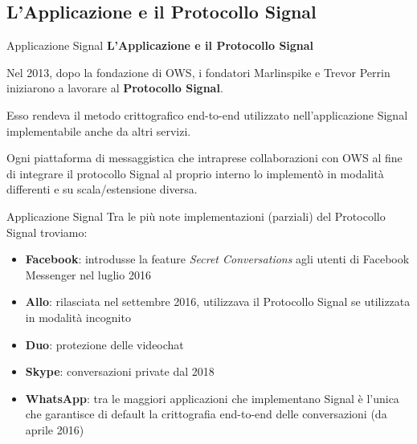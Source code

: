 \subsection{L'Applicazione e il Protocollo Signal}
\begin{frame}{Applicazione Signal}
    \textbf{L'Applicazione e il Protocollo Signal}
    \newline
    
    Nel 2013, dopo la fondazione di OWS, i fondatori Marlinspike e Trevor Perrin iniziarono a lavorare al \textbf{Protocollo Signal}.\newline\pause
    
    Esso rendeva il metodo crittografico end-to-end utilizzato nell’applicazione Signal implementabile anche da altri servizi. \newline\pause
    
    Ogni piattaforma di messaggistica che intraprese collaborazioni con OWS al fine di integrare il protocollo Signal al proprio interno lo implementò in modalità differenti e su scala/estensione diversa.

\end{frame}

\begin{frame}{Applicazione Signal}
    Tra le più note implementazioni (parziali) del Protocollo Signal troviamo:
    \begin{itemize}
        \item <1-> \textbf{Facebook}: introdusse la feature \textit{Secret Conversations} agli utenti di Facebook Messenger nel luglio 2016
        \item <2-> \textbf{Allo}: rilasciata nel settembre 2016, utilizzava il Protocollo Signal se utilizzata in modalità incognito
        \item <3-> \textbf{Duo}: protezione delle videochat
        \item <4-> \textbf{Skype}: conversazioni private dal 2018
        \item <5-> \textbf{WhatsApp}: tra le maggiori applicazioni che implementano Signal è l’unica che garantisce di default la crittografia end-to-end delle conversazioni (da aprile 2016)
    \end{itemize}
    
\end{frame}

